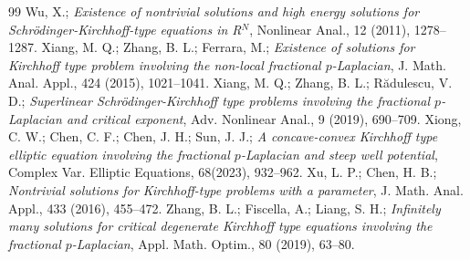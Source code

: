 \documentclass[10pt,a4paper]{amsart}
\numberwithin{equation}{section}
\begin{document}
\begin{thebibliography}{99}
 Wu, X.; \emph{Existence of nontrivial solutions and high energy solutions for Schr\"{o}dinger-Kirchhoff-type equations in R$^N$}, Nonlinear Anal., 12 (2011), 1278--1287.
 Xiang, M. Q.; Zhang, B. L.; Ferrara, M.; \emph{Existence of solutions for Kirchhoff type problem involving the non-local fractional $p$-Laplacian}, J. Math. Anal. Appl., 424 (2015), 1021--1041.
 Xiang, M. Q.; Zhang, B. L.; R\u{a}dulescu, V. D.; \emph{Superlinear Schr\"{o}dinger-Kirchhoff type problems involving the fractional $p$-Laplacian and critical exponent}, Adv. Nonlinear Anal., 9 (2019), 690--709.
 Xiong, C. W.; Chen, C. F.; Chen, J. H.; Sun, J. J.; \emph{A concave-convex Kirchhoff type elliptic equation involving the fractional $p$-Laplacian and steep well potential}, Complex Var. Elliptic Equations, 68(2023), 932--962.
 Xu, L. P.; Chen, H. B.; \emph{Nontrivial solutions for Kirchhoff-type problems with a parameter}, J. Math. Anal. Appl., 433 (2016), 455--472.
 Zhang, B. L.; Fiscella, A.; Liang, S. H.; \emph{Infinitely many solutions for critical degenerate Kirchhoff type equations involving the fractional $p$-Laplacian}, Appl. Math. Optim., 80 (2019), 63--80.
\end{thebibliography}
\end{document}

